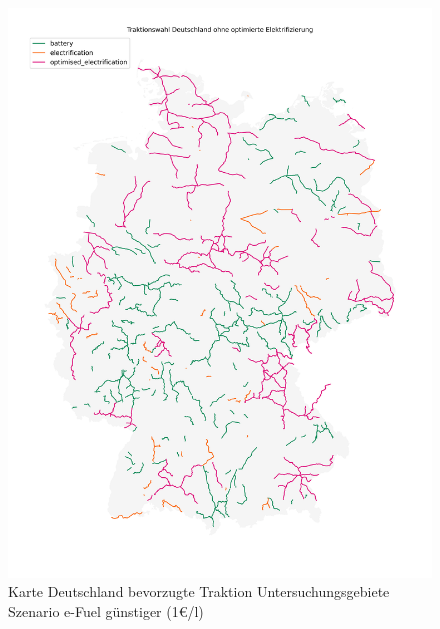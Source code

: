 \begin{center}
	\begin{figure}[p]
	\includegraphics[height=0.8\textheight]{../report_scenarios/s_21/files/deutschland_map}
	\caption{\label{fig_s_21_d_map} Karte Deutschland bevorzugte Traktion Untersuchungsgebiete Szenario e-Fuel günstiger (1€/l)}
	\end{figure}
\end{center}

